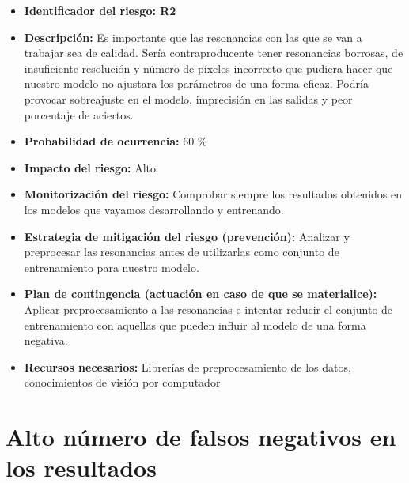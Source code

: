 \begin{itemize}
	\item \textbf{Identificador del riesgo: R2 }
	\item \textbf{Descripción: } Es importante que las resonancias con las que se van a trabajar sea de calidad. Sería contraproducente tener resonancias borrosas, de insuficiente resolución y número de píxeles incorrecto que pudiera hacer que nuestro modelo no ajustara los parámetros de una forma eficaz. Podría provocar sobreajuste en el modelo, imprecisión en las salidas y peor porcentaje de aciertos.
	\item \textbf{Probabilidad de ocurrencia: } 60 \%
	\item \textbf{Impacto del riesgo: } Alto
	\item \textbf{Monitorización del riesgo: } Comprobar siempre los resultados obtenidos en los modelos que vayamos desarrollando y entrenando. 
	\item \textbf{Estrategia de mitigación del riesgo (prevención): }  Analizar y preprocesar las resonancias antes de utilizarlas como conjunto de entrenamiento para nuestro modelo.
	\item \textbf{Plan de contingencia (actuación en caso de que se materialice): } Aplicar preprocesamiento a las resonancias e intentar reducir el conjunto de entrenamiento con aquellas que pueden influir al modelo de una forma negativa. 
	\item \textbf{Recursos necesarios: } Librerías de preprocesamiento de los datos, conocimientos de visión por computador
\end{itemize}

\section{Alto número de falsos negativos en los resultados}

